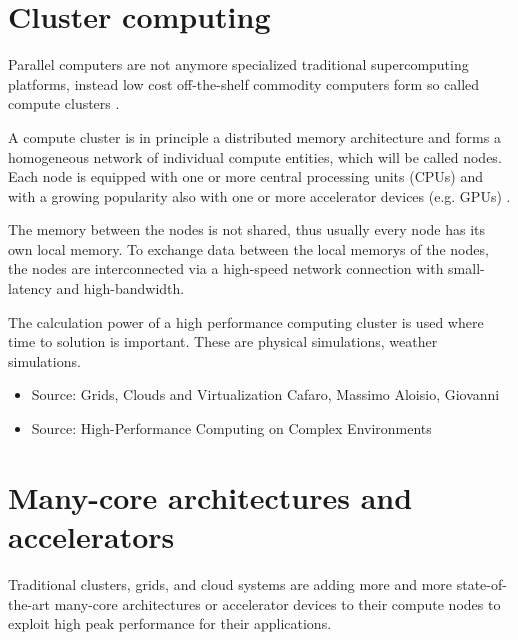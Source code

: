 \section{Cluster computing}
Parallel computers are not anymore specialized traditional
supercomputing platforms, instead low cost off-the-shelf commodity
computers form so called compute clusters \cite{ref:hpcc1}.

A compute cluster is in principle a distributed memory architecture
and forms a homogeneous network of individual compute entities, which
will be called nodes. Each node is equipped with one or more central
processing units (CPUs) and with a growing popularity also with one or
more accelerator devices (e.g. GPUs) \cite{ref:accel}.

The memory between the nodes is not shared, thus usually every node
has its own local memory. To exchange data between the local memorys
of the nodes, the nodes are interconnected via a high-speed network
connection with small-latency and high-bandwidth.

The calculation power of a high performance computing cluster
is used where time to solution is important. These are
physical simulations\cite{ref:picongpu}, weather simulations.

\begin{itemize}
  \item Source: Grids, Clouds and Virtualization Cafaro, Massimo Aloisio, Giovanni
  \item Source: High-Performance Computing on Complex Environments
\end{itemize}

\section{Many-core architectures and accelerators}
\label{sec:accel}

Traditional clusters, grids, and cloud systems are adding more and
more state-of-the-art many-core architectures or accelerator devices
to their compute nodes to exploit high peak performance for their applications.

